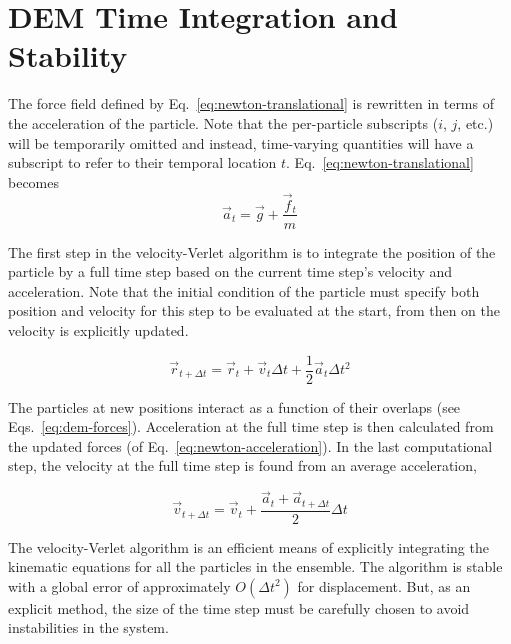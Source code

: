 \chapter{DEM Time Integration and Stability}\label{sec:dem-stability}

The force field defined by Eq.~\ref{eq:newton-translational} is rewritten in terms of the acceleration of the particle. Note that the per-particle subscripts ($i$, $j$, etc.) will be temporarily omitted and instead, time-varying quantities will have a subscript to refer to their temporal location $t$. Eq.~\ref{eq:newton-translational} becomes
\begin{equation}\label{eq:newton-acceleration}
	\vec{a}_t = \vec{g} + \frac{\vec{f}_t}{m}
\end{equation}

The first step in the velocity-Verlet algorithm is to integrate the position of the particle by a full time step based on the current time step's velocity and acceleration. Note that the initial condition of the particle must specify both position and velocity for this step to be evaluated at the start, from then on the velocity is explicitly updated.

\begin{equation}
	\vec{r}_{t+\Delta t} = \vec{r}_t + \vec{v}_t\Delta t + \frac{1}{2}\vec{a}_t\Delta t^2
\end{equation}

The particles at new positions interact as a function of their overlaps (see Eqs.~\ref{eq:dem-forces}). Acceleration at the full time step is then calculated from the updated forces (of Eq.~\ref{eq:newton-acceleration}). In the last computational step, the velocity at the full time step is found from an average acceleration,

\begin{equation}
	\vec{v}_{t+\Delta t} = \vec{v}_t + \frac{\vec{a}_t + \vec{a}_{t+\Delta t}}{2}\Delta t
\end{equation}

The velocity-Verlet algorithm is an efficient means of explicitly integrating the kinematic equations for all the particles in the ensemble. The algorithm is stable with a global error of approximately $O(\Delta t^2)$ for displacement.\cite{Grubmuller1991} But, as an explicit method, the size of the time step must be carefully chosen to avoid instabilities in the system.




